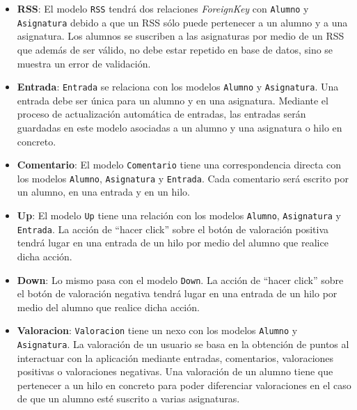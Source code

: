 \documentclass[a4paper, 12pt]{book}
\begin{document}
\begin{itemize}
  Para realizar la relaci\'on \texttt{Asignatura} - \texttt{Alumno} se ha utilizado un modelo intermedio \texttt{RSS} a trav\'es del argumento 
  \textit{Through}. Con este argumento, a la relaci\'on \textit{ManyToMany} se le est\'a se\~nalando que va a actuar un modelo intermediario. El modelo 
  intermediario se utilizar\'a para regular esta relaci\'on por lo que se pueden colocar campos adicionales en \texttt{RSS} para que \texttt{Asignatura}
  pueda acceder a m\'as datos relevantes de \texttt{Alumno}.
  \item {\bfseries RSS}: El modelo \texttt{RSS} tendr\'a dos relaciones \textit{ForeignKey} con \texttt{Alumno} y \texttt{Asignatura} debido
  a que un RSS s\'olo puede pertenecer a un alumno y a una asignatura. Los alumnos se suscriben a las asignaturas por medio de un RSS que adem\'as de 
  ser v\'alido, no debe estar repetido en base de datos, sino se muestra un error de validaci\'on.
  \item {\bfseries Entrada}: \texttt{Entrada} se relaciona con los modelos \texttt{Alumno} y \texttt{Asignatura}. Una entrada debe ser \'unica para un 
  alumno y en una asignatura. Mediante el proceso de actualizaci\'on autom\'atica de entradas, las entradas ser\'an guardadas en este modelo asociadas
  a un alumno y una asignatura o hilo en concreto.
  \item {\bfseries Comentario}: El modelo \texttt{Comentario} tiene una correspondencia directa con los modelos \texttt{Alumno}, \texttt{Asignatura} y 
  \texttt{Entrada}. Cada comentario ser\'a escrito por un alumno, en una entrada y en un hilo.
  \item {\bfseries Up}: El modelo \texttt{Up} tiene una relaci\'on con los modelos \texttt{Alumno}, \texttt{Asignatura} y \texttt{Entrada}. La acci\'on de 
  ``hacer click'' sobre el bot\'on de valoraci\'on positiva tendr\'a lugar en una entrada de un hilo por medio del alumno que realice dicha acci\'on.
  \item {\bfseries Down}: Lo mismo pasa con el modelo \texttt{Down}. La acci\'on de ``hacer click'' sobre el bot\'on de valoraci\'on negativa tendr\'a 
  lugar en una entrada de un hilo por medio del alumno que realice dicha acci\'on.
  \item {\bfseries Valoracion}: \texttt{Valoracion} tiene un nexo con los modelos \texttt{Alumno} y \texttt{Asignatura}. La valoraci\'on de un usuario se 
  basa en la obtenci\'on de puntos al interactuar con la aplicaci\'on mediante entradas, comentarios, valoraciones positivas o valoraciones negativas.
  Una valoraci\'on de un alumno tiene que pertenecer a un hilo en concreto para poder diferenciar valoraciones en el caso de que un alumno est\'e suscrito
  a varias asignaturas.
\end{itemize}
\end{document}

